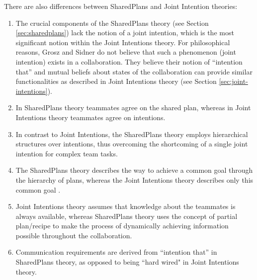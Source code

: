 \documentclass[12pt]{report}
\begin{document}
There are also differences between SharedPlans and Joint Intention theories:

\begin{enumerate}
  \item The crucial components of the SharedPlans theory (see Section  
  \ref{sec:sharedplans}) lack the notion of a joint intention, which is the most
  significant notion within the Joint Intentions theory. For philosophical
  reasons, Grosz and Sidner do not believe that such a phenomenon (joint
  intention) exists in a collaboration. They believe their notion of ``intention
  that'' and mutual beliefs about states of the collaboration can provide
  similar functionalities as described in Joint Intentions theory (see Section
  \ref{sec:joint-intentions}).
  
  \item In SharedPlans theory teammates agree on the shared plan, whereas in
  Joint Intentions theory teammates agree on intentions.
  
  \item In contrast to Joint Intentions, the SharedPlans theory employs
  hierarchical structures over intentions, thus overcoming the shortcoming of
  a single joint intention for complex team tasks.
  
  \item The SharedPlans theory describes the way to achieve a common goal
  through the hierarchy of plans, whereas the Joint Intentions theory describes
  only this common goal \cite{skubch:modelling-behavior-robots}.
  
  \item Joint Intentions theory assumes that knowledge about the teammates is
  always available, whereas SharedPlans theory uses the concept of partial
  plan/recipe to make the process of dynamically achieving information possible
  throughout the collaboration.
  
  \item Communication requirements are derived from ``intention that'' in
  SharedPlans theory, as opposed to being ``hard wired" in Joint Intentions
  theory.
\end{enumerate}
\end{document}
